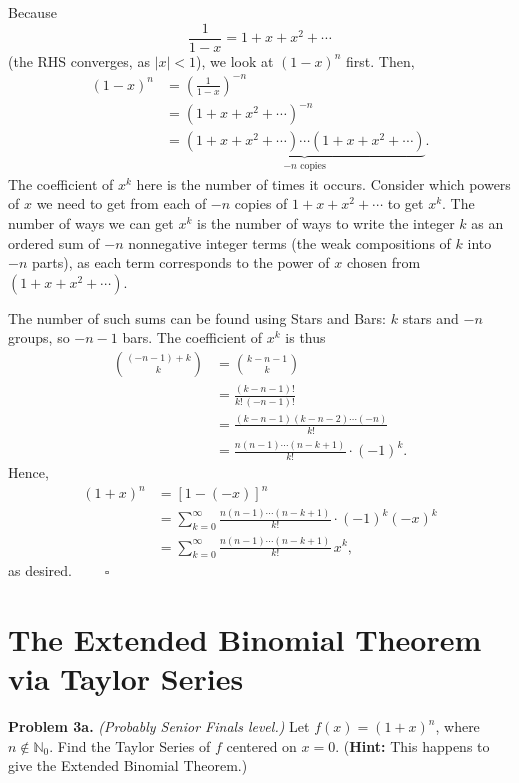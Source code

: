 \documentclass{article}
\begin{document}
\noindent Because
\[
    \frac{1}{1-x} = 1 + x + x^2 + \cdots
\]
(the RHS converges, as $|x| < 1$), we look at $(1-x)^n$ first. Then,
\begin{align*}
    (1-x)^n &= \left(\frac{1}{1-x}\right)^{-n} \\
            &= \left(1 + x + x^2 + \cdots\right)^{-n} \\
            &= \underbrace{\left(1 + x + x^2 + \cdots\right) \cdots \left(1 + x + x^2 + \cdots\right)}_{-n \text{ copies}}.
\end{align*}
The coefficient of $x^k$ here is the number of times it occurs. Consider which powers of $x$ we need to get from each of $-n$ copies of $1 + x + x^2 + \cdots$ to get $x^k$. The number of ways we can get $x^k$ is the number of ways to write the integer $k$ as an ordered sum of $-n$ nonnegative integer terms (the weak compositions of $k$ into $-n$ parts), as each term corresponds to the power of $x$ chosen from $\left(1 + x + x^2 + \cdots\right)$.

\medskip

\noindent The number of such sums can be found using Stars and Bars: $k$ stars and $-n$ groups, so $-n-1$ bars. The coefficient of $x^k$ is thus
\begin{align*}
    \binom{(-n-1)+k}{k} &= \binom{k-n-1}{k} \\
                        &= \frac{(k-n-1)!}{k!\,(-n-1)!} \\
                        &= \frac{(k-n-1)(k-n-2)\cdots(-n)}{k!} \\
                        &= \frac{n(n-1)\cdots(n-k+1)}{k!} \cdot (-1)^k.
\end{align*}
Hence,
\begin{align*}
    (1+x)^n &= \left[1 - (-x)\right]^n \\
            &= \sum_{k=0}^{\infty} \frac{n(n-1)\cdots(n-k+1)}{k!} \cdot (-1)^k (-x)^k \\
            &= \sum_{k=0}^{\infty} \frac{n(n-1)\cdots(n-k+1)}{k!}\, x^k,
\end{align*}
as desired. $\qquad \square$

\section{The Extended Binomial Theorem via Taylor Series}

\noindent\textbf{Problem 3a.} \textit{(Probably Senior Finals level.)} Let $f(x) = (1+x)^n$, where $n \notin \mathbb{N}_0$. Find the Taylor Series of $f$ centered on $x = 0$. (\textbf{Hint:} This happens to give the Extended Binomial Theorem.)
\end{document}
